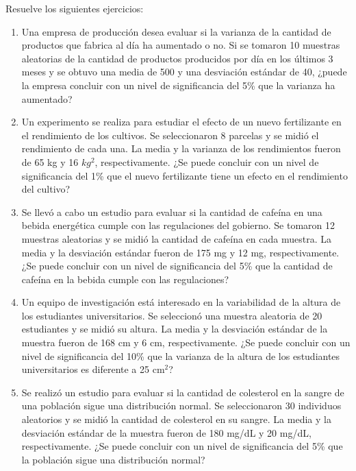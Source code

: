 \begin{Ejer}
Resuelve los siguientes ejercicios:

\begin{enumerate}
    \item Una empresa de producción desea evaluar si la varianza de la cantidad de productos que fabrica al día ha aumentado o no. Si se tomaron 10 muestras aleatorias de la cantidad de productos producidos por día en los últimos 3 meses y se obtuvo una media de 500 y una desviación estándar de 40, ¿puede la empresa concluir con un nivel de significancia del 5\% que la varianza ha aumentado?

    \item Un experimento se realiza para estudiar el efecto de un nuevo fertilizante en el rendimiento de los cultivos. Se seleccionaron 8 parcelas y se midió el rendimiento de cada una. La media y la varianza de los rendimientos fueron de 65 kg y 16 $kg^2$, respectivamente. ¿Se puede concluir con un nivel de significancia del 1\% que el nuevo fertilizante tiene un efecto en el rendimiento del cultivo?

    \item Se llevó a cabo un estudio para evaluar si la cantidad de cafeína en una bebida energética cumple con las regulaciones del gobierno. Se tomaron 12 muestras aleatorias y se midió la cantidad de cafeína en cada muestra. La media y la desviación estándar fueron de 175 mg y 12 mg, respectivamente. ¿Se puede concluir con un nivel de significancia del 5\% que la cantidad de cafeína en la bebida cumple con las regulaciones?

    \item Un equipo de investigación está interesado en la variabilidad de la altura de los estudiantes universitarios. Se seleccionó una muestra aleatoria de 20 estudiantes y se midió su altura. La media y la desviación estándar de la muestra fueron de 168 cm y 6 cm, respectivamente. ¿Se puede concluir con un nivel de significancia del 10\% que la varianza de la altura de los estudiantes universitarios es diferente a 25 cm$^2$?

    \item Se realizó un estudio para evaluar si la cantidad de colesterol en la sangre de una población sigue una distribución normal. Se seleccionaron 30 individuos aleatorios y se midió la cantidad de colesterol en su sangre. La media y la desviación estándar de la muestra fueron de 180 mg/dL y 20 mg/dL, respectivamente. ¿Se puede concluir con un nivel de significancia del 5\% que la población sigue una distribución normal?


\end{enumerate}
\end{Ejer}
